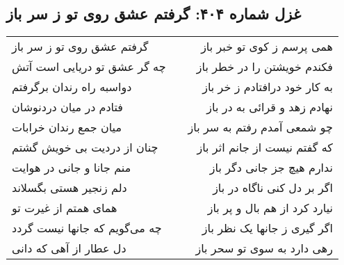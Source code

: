 \begin{center}
\section*{غزل شماره ۴۰۴: گرفتم عشق روی تو ز سر باز}
\label{sec:404}
\begin{longtable}{l p{0.5cm} r}
گرفتم عشق روی تو ز سر باز
&&
همی پرسم ز کوی تو خبر باز
\\
چه گر عشق تو دریایی است آتش
&&
فکندم خویشتن را در خطر باز
\\
دواسبه راه رندان برگرفتم
&&
به کار خود درافتادم ز خر باز
\\
فتادم در میان دردنوشان
&&
نهادم زهد و قرائی به در باز
\\
میان جمع رندان خرابات
&&
چو شمعی آمدم رفتم به سر باز
\\
چنان از دردیت بی خویش گشتم
&&
که گفتم نیست از جانم اثر باز
\\
منم جانا و جانی در هوایت
&&
ندارم هیچ جز جانی دگر باز
\\
دلم زنجیر هستی بگسلاند
&&
اگر بر دل کنی ناگاه در باز
\\
همای همتم از غیرت تو
&&
نیارد کرد از هم بال و پر باز
\\
چه می‌گویم که جانها نیست گردد
&&
اگر گیری ز جانها یک نظر باز
\\
دل عطار از آهی که دانی
&&
رهی دارد به سوی تو سحر باز
\\
\end{longtable}
\end{center}
